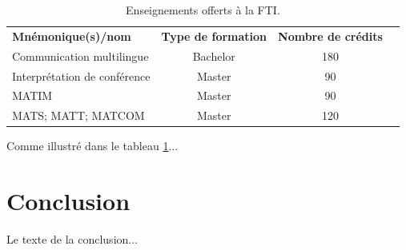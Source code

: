 \documentclass[a4paper,12pt]{article} %
\begin{document}
\begin{table}[ht] %
\centering
\begin{tabular}{lccc} %
\toprule %
\textbf{ Mnémonique(s)/nom } & \textbf{ Type de formation } & \textbf{ Nombre de crédits } \\ %
Communication multilingue               & Bachelor               & 180 \\
Interprétation de conférence                & Master               &  90   \\
MATIM              & Master              & 90   \\
MATS; MATT; MATCOM    & Master              & 120 \\
\bottomrule
\end{tabular}
\caption{Enseignements offerts à la FTI.}
\label{tab:enseignements} %
\end{table}

Comme illustré dans le tableau \ref{tab:enseignements}... %

\section{Conclusion} %
Le texte de la conclusion... \cite{hengchen2015extraction}

\end{document}
